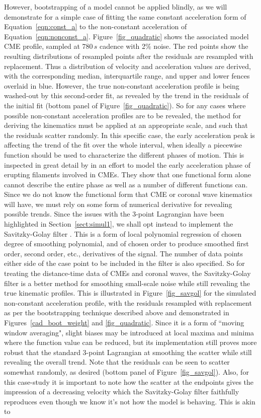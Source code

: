 \documentclass[structabstract]{aa}
\begin{document}
However, bootstrapping of a model cannot be applied blindly, as we will demonstrate for a simple case of fitting the same constant acceleration form of Equation~\ref{eqn:const_a} to the non-constant acceleration of Equation~\ref{eqn:nonconst_a}. Figure~\ref{fig_quadratic} shows the associated model CME profile, sampled at 780$\,s$ cadence with 2\% noise. The red points show the resulting distributions of resampled points after the residuals are resampled with replacement. Thus a distribution of velocity and acceleration values are derived, with the corresponding median, interquartile range, and upper and lower fences overlaid in blue. However, the true non-constant acceleration profile is being washed-out by this second-order fit, as revealed by the trend in the residuals of the initial fit (bottom panel of Figure~\ref{fig_quadratic}). So for any cases where possible non-constant acceleration profiles are to be revealed, the method for deriving the kinematics must be applied at an appropriate scale, and such that the residuals scatter randomly. In this specific case, the early acceleration peak is affecting the trend of the fit over the whole interval, when ideally a piecewise function should be used to characterize the different phases of motion. This is inspected in great detail by \citet{2008ApJ...674..586S} in an effort to model the early acceleration phase of erupting filaments involved in CMEs. They show that one functional form alone cannot describe the entire phase as well as a number of different functions can. Since we do not know the functional form that CME or coronal wave kinematics will have, we must rely on some form of numerical derivative for revealing possible trends. Since the issues with the 3-point Lagrangian have been highlighted in Section~\ref{sect:simul1}, we shall opt instead to implement the Savitzky-Golay filter \citep{Savitzky-Golay1964}. This is a form of local polynomial regression of chosen degree of smoothing polynomial, and of chosen order to produce smoothed first order, second order, etc., derivatives of the signal. The number of data points either side of the case point to be included in the filter is also specified. So for treating the distance-time data of CMEs and coronal waves, the Savitzky-Golay filter is a better method for smoothing small-scale noise while still revealing the true kinematic profiles. This is illustrated in Figure~\ref{fig_savgol} for the simulated non-constant acceleration profile, with the residuals resampled with replacement as per the bootstrapping technique described above and demonstrated in Figures~\ref{cad_boot_weight} and \ref{fig_quadratic}. Since it is a form of ``moving window averaging", slight biases may be introduced at local maxima and minima where the function value can be reduced, but its implementation still proves more robust that the standard 3-point Lagrangian at smoothing the scatter while still revealing the overall trend. Note that the residuals can be seen to scatter somewhat randomly, as desired (bottom panel of Figure~\ref{fig_savgol}). Also, for this case-study it is important to note how the scatter at the endpoints gives the impression of a decreasing velocity which the Savitzky-Golay filter faithfully reproduces even though we know it's not how the model is behaving. This is akin to 
\end{document}
